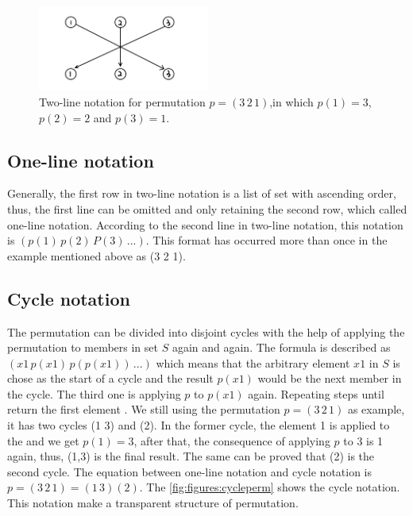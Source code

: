     \begin{figure}[htb]
      \centering
      \includegraphics[width=0.5\textwidth]{../../image/twolineperm.png}
      \caption{Two-line notation for permutation \(p=(3\,2\,1)\),in which \(p(1)=3\), \(p(2)=2\) and \(p(3)=1\).}
      \label{fig:figures:twolineperm}
    \end{figure}

\subsection*{One-line notation}

Generally, the first row in two-line notation is a list of set with ascending order, thus, the first line can be omitted and only retaining the second row, which called one-line notation. According to the second line in two-line notation, this notation is \((p(1)\,p(2)\,P(3)\,...)\). This format has occurred more than once in the example mentioned above as (3 2 1).

\subsection*{Cycle notation}

The permutation can be divided into disjoint cycles with the help of applying the permutation to members in set \(S\) again and again. The formula is described as \((x1\,p(x1)\,p(p(x1))\,...)\) which means that the arbitrary element \(x1\) in \(S\) is chose as the start of a cycle and the result \(p(x1)\) would be the next member in the cycle. The third one is applying \(p\) to \(p(x1)\) again. Repeating steps until return the first element . We still using the permutation \(p=(3\,2\,1)\) as example, it has two cycles (1 3) and (2). In the former cycle, the element 1 is applied to the  and we get \(p(1)=3\), after that, the consequence of applying \(p\) to 3 is 1 again, thus, (1,3) is the final result. The same can be proved that (2) is the second cycle. The equation between one-line notation and cycle notation is \(p=(3\,2\,1)=(1\,3)(2)\). The \cref{fig:figures:cycleperm} shows the cycle notation. This notation make a transparent structure of permutation.


